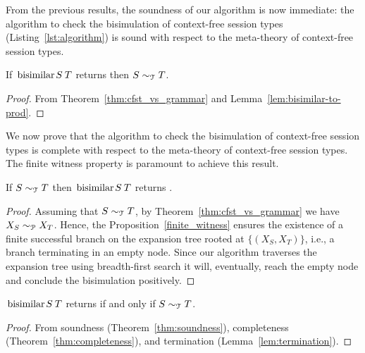 From the previous results, the soundness of our algorithm is now
immediate: the algorithm to check the bisimulation of context-free
session types (Listing~\ref{lst:algorithm}) is sound with respect to
the meta-theory of context-free session types.

\begin{theorem}[Soundness]
\label{thm:soundness}
  If $\bisimf ST$ returns  then $S\sim_\mathcal T T$.
\end{theorem}
%
\begin{proof}
  From Theorem~\ref{thm:cfst_vs_grammar} and
  Lemma~\ref{lem:bisimilar-to-prod}.
\end{proof}

 
We now prove that the algorithm to check the bisimulation of context-free session 
types is complete with respect to the meta-theory of context-free session
types. The finite witness property is paramount to achieve this result.

\begin{theorem}[Completeness]
\label{thm:completeness}
  If $S \sim_\mathcal T T$ then $\bisimf S T$ returns
  .
\end{theorem}
%
\begin{proof}
  Assuming that $S \sim_\mathcal T T$, by Theorem~\ref{thm:cfst_vs_grammar}
  we have $X_{S} \sim_\mathcal P X_{T}$.  Hence, the Proposition~\ref{finite_witness}
  ensures the existence of a finite successful branch on the
  expansion tree rooted at $\{(X_{S},X_{T})\}$, i.e., a branch
  terminating in an empty node.  Since our algorithm traverses the
  expansion tree using breadth-first search it will, eventually, reach
  the empty node and conclude the bisimulation positively.
\end{proof}


\begin{corollary}[Correctness]
  $\bisimf ST$ returns  if and only if
  $S\sim_\mathcal T T$.
\end{corollary}
%
\begin{proof}
  From soundness (Theorem~\ref{thm:soundness}), completeness
  (Theorem~\ref{thm:completeness}), and termination
  (Lemma~\ref{lem:termination}).
\end{proof}

